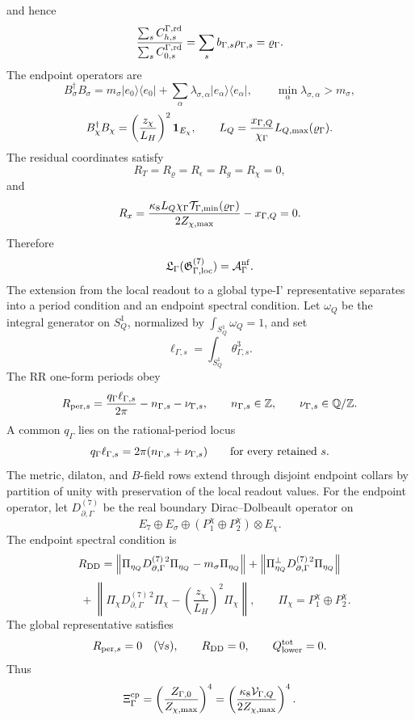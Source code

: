 \documentclass[11pt]{article}
\theoremstyle{definition}
\theoremstyle{remark}
\begin{document}
and hence
\[
  \frac{\sum_sC_{h,s}^{\Gamma,{\rm rd}}}
  {\sum_sC_{0,s}^{\Gamma,{\rm rd}}}
  =
  \sum_s b_{\Gamma,s}\rho_{\Gamma,s}
  =
  \varrho_\Gamma.
\]
The endpoint operators are
\[
  B_\sigma^\dagger B_\sigma
  =
  m_\sigma |e_0\rangle\langle e_0|
  +
  \sum_\alpha
  \lambda_{\sigma,\alpha}|e_\alpha\rangle\langle e_\alpha|,
  \qquad
  \min_\alpha\lambda_{\sigma,\alpha}>m_\sigma,
\]
\[
  B_\chi^\dagger B_\chi
  =
  \left(\frac{z_\chi}{L_H}\right)^2{\bf 1}_{E_\chi},
  \qquad
  L_Q=
  \frac{x_{\Gamma,Q}}{\chi_\Gamma}L_{Q,\max}(\varrho_\Gamma).
\]
The residual coordinates satisfy
\[
  R_T=R_\varrho=R_\epsilon=R_g=R_\chi=0,
\]
and
\[
  R_x
  =
  \frac{\kappa_8L_Q\chi_\Gamma
  {\cal T}_{\Gamma,\min}(\varrho_\Gamma)}
  {2Z_{\chi,\max}}
  -x_{\Gamma,Q}
  =
  0.
\]
Therefore
\[
  {\mathfrak L}_\Gamma({\mathfrak G}_{\Gamma,{\rm loc}}^{(7)})
  =
  {\cal A}_\Gamma^{\rm nf}.
\]
The extension from the local readout to a global type-I' representative
separates into a period condition and an endpoint spectral condition.  Let
\(\omega_Q\) be the integral generator on \(S_Q^1\), normalized by
\(\int_{S_Q^1}\omega_Q=1\), and set
\[
  \ell_{\Gamma,s}
  =
  \int_{S_Q^1}\theta_{\Gamma,s}^3 .
\]
The RR one-form periods obey
\[
  R_{{\rm per},s}
  =
  \frac{q_\Gamma\ell_{\Gamma,s}}{2\pi}
  -n_{\Gamma,s}-\nu_{\Gamma,s},
  \qquad
  n_{\Gamma,s}\in{\mathbb Z},
  \qquad
  \nu_{\Gamma,s}\in{\mathbb Q}/{\mathbb Z}.
\]
A common \(q_\Gamma\) lies on the rational-period locus
\[
  q_\Gamma\ell_{\Gamma,s}
  =
  2\pi(n_{\Gamma,s}+\nu_{\Gamma,s})
  \qquad
  \hbox{for every retained }s.
\]
The metric, dilaton, and \(B\)-field rows extend through disjoint endpoint
collars by partition of unity with preservation of the local readout values.
For the endpoint operator, let \(D_{\partial,\Gamma}^{(7)}\) be the real
boundary Dirac--Dolbeault operator on
\[
  E_7\oplus E_\sigma\oplus
  (P_1^\chi\oplus P_2^\chi)\otimes E_\chi .
\]
The endpoint spectral condition is
\[
  R_{\rm DD}
  =
  \left\|
  \Pi_{\eta_Q}D_{\partial,\Gamma}^{(7)\,2}\Pi_{\eta_Q}
  -m_\sigma\Pi_{\eta_Q}
  \right\|
  +
  \left\|
  \Pi_{\eta_Q}^{\perp}D_{\partial,\Gamma}^{(7)\,2}\Pi_{\eta_Q}
  \right\|
\]
\[
  \quad+
  \left\|
  \Pi_\chi D_{\partial,\Gamma}^{(7)\,2}\Pi_\chi
  -
  \left(\frac{z_\chi}{L_H}\right)^2\Pi_\chi
  \right\|,
  \qquad
  \Pi_\chi=P_1^\chi\oplus P_2^\chi .
\]
The global representative satisfies
\[
  R_{{\rm per},s}=0\quad(\forall s),
  \qquad
  R_{\rm DD}=0,
  \qquad
  Q_{\rm lower}^{\rm tot}=0 .
\]
Thus
\[
  \Xi_\Gamma^{\rm cp}
  =
  \left(
  \frac{Z_{\Gamma,0}}{Z_{\chi,\max}}
  \right)^4
  =
  \left(
  \frac{\kappa_8{\cal V}_{\Gamma,Q}}
  {2Z_{\chi,\max}}
  \right)^4 .
\]
\end{document}
